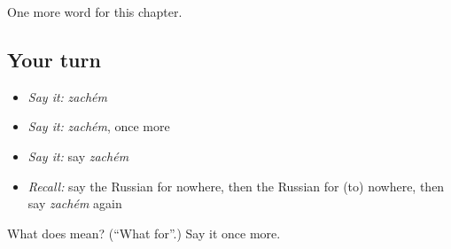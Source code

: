 \begin{grammarlens}[title={What you've built}]
One more word for this chapter.
\end{grammarlens}

\subsection*{Your turn}
\begin{itemize}
\raggedright
  \item \emph{Say it:} \emph{zachém}
  \item \emph{Say it:} \emph{zachém}, once more
  \item \emph{Say it:} say \emph{zachém}
  \item \emph{Recall:} say the Russian for nowhere, then the Russian for (to) nowhere, then say \emph{zachém} again
\end{itemize}

\begin{tcolorbox}[breakable,colback=teal!4,colframe=teal!35!black,title={Before you move on}]
What does  mean? (\textquotedblleft{}What for\textquotedblright{}.) Say it once more.
\end{tcolorbox}
